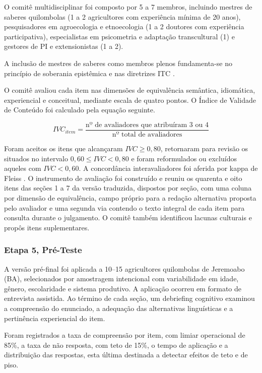 \documentclass[preprint,authoryear,12pt]{elsarticle}
\begin{document}
O comitê multidisciplinar foi composto por 5 a 7 membros, incluindo mestres de saberes quilombolas (1 a 2 agricultores com experiência mínima de 20 anos), pesquisadores em agroecologia e etnoecologia (1 a 2 doutores com experiência participativa), especialistas em psicometria e adaptação transcultural (1) e gestores de PI e extensionistas (1 a 2).

A inclusão de mestres de saberes como membros plenos fundamenta-se no princípio de soberania epistêmica \citep{Santos2007} e nas diretrizes ITC \citep{ITC2017}.

O comitê avaliou cada item nas dimensões de equivalência semântica, idiomática, experiencial e conceitual, mediante escala de quatro pontos. O Índice de Validade de Conteúdo foi calculado pela equação seguinte.

\begin{equation}
IVC_{item} = \frac{\text{nº de avaliadores que atribuíram 3 ou 4}}{\text{nº total de avaliadores}}
\end{equation}

Foram aceitos os itens que alcançaram $IVC \geq 0{,}80$, retornaram para revisão os situados no intervalo $0{,}60 \leq IVC < 0{,}80$ e foram reformulados ou excluídos aqueles com $IVC < 0{,}60$. A concordância interavaliadores foi aferida por kappa de Fleiss \citep{Fleiss1971}. O instrumento de avaliação foi construído e reuniu os quarenta e oito itens das seções 1 a 7 da versão traduzida, dispostos por seção, com uma coluna por dimensão de equivalência, campo próprio para a redação alternativa proposta pelo avaliador e uma segunda via contendo o texto integral de cada item para consulta durante o julgamento. O comitê também identificou lacunas culturais e propôs itens suplementares.

\subsubsection{Etapa 5, Pré-Teste}

A versão pré-final foi aplicada a 10--15 agricultores quilombolas de Jeremoabo (BA), selecionados por amostragem intencional com variabilidade em idade, gênero, escolaridade e sistema produtivo. A aplicação ocorreu em formato de entrevista assistida. Ao término de cada seção, um debriefing cognitivo \citep{Willis2005} examinou a compreensão do enunciado, a adequação das alternativas linguísticas e a pertinência experiencial do item.

Foram registrados a taxa de compreensão por item, com limiar operacional de 85\%, a taxa de não resposta, com teto de 15\%, o tempo de aplicação e a distribuição das respostas, esta última destinada a detectar efeitos de teto e de piso.
\end{document}
